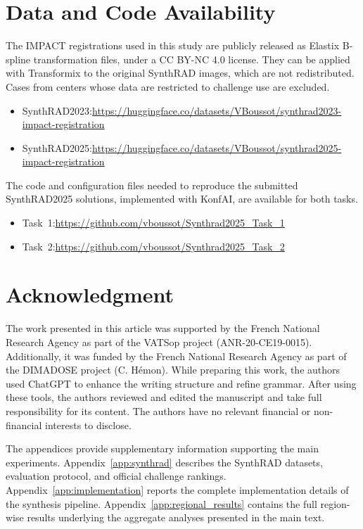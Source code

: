 \documentclass[lettersize,journal]{IEEEtran}
\begin{document}
\section{Data and Code Availability}
The IMPACT registrations used in this study are publicly released as Elastix B-spline transformation files, under a CC BY-NC 4.0 license. They can be applied with Transformix to the original SynthRAD images, which are not redistributed. Cases from centers whose data are restricted to challenge use are excluded.
\begin{itemize}
\item SynthRAD2023:\newline \url{https://huggingface.co/datasets/VBoussot/synthrad2023-impact-registration}
\item SynthRAD2025:\newline \url{https://huggingface.co/datasets/VBoussot/synthrad2025-impact-registration}
\end{itemize}
The code and configuration files needed to reproduce the submitted SynthRAD2025 solutions, implemented with KonfAI, are available for both tasks.
\begin{itemize}
\item Task~1:\newline \url{https://github.com/vboussot/Synthrad2025_Task_1}
\item Task~2:\newline \url{https://github.com/vboussot/Synthrad2025_Task_2}
\end{itemize}

\section*{Acknowledgment}
The work presented in this article was supported by the French National Research Agency as part of the VATSop project (ANR-20-CE19-0015). Additionally, it was funded by the French National Research Agency as part of the DIMADOSE project (C. Hémon). While preparing this work, the authors used ChatGPT to enhance the writing structure and refine grammar. After using these tools, the authors reviewed and edited the manuscript and take full responsibility for its content. The authors have no relevant financial or non-financial interests to disclose. 

 


\appendices

The appendices provide supplementary information supporting the main experiments. Appendix~\ref{app:synthrad} describes the SynthRAD
datasets, evaluation protocol, and official challenge rankings. Appendix~\ref{app:implementation} reports the complete implementation
details of the synthesis pipeline. Appendix~\ref{app:regional_results} contains the full region-wise results underlying the aggregate analyses presented in the main text.
\end{document}
